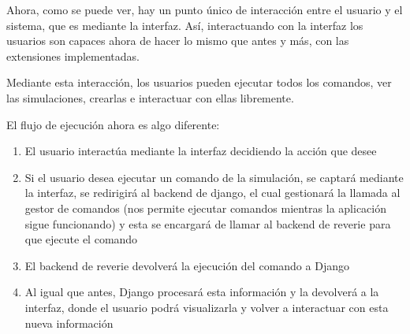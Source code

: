 Ahora, como se puede ver, hay un punto único de interacción entre el usuario y el sistema, que es mediante la interfaz. Así, interactuando con la interfaz los usuarios son capaces ahora de hacer lo mismo que antes y más, con las extensiones implementadas.

Mediante esta interacción, los usuarios pueden ejecutar todos los comandos, ver las simulaciones, crearlas e interactuar con ellas libremente.

El flujo de ejecución ahora es algo diferente:

\begin{enumerate}
	\item El usuario interactúa mediante la interfaz decidiendo la acción que desee
	
	\item Si el usuario desea ejecutar un comando de la simulación, se captará mediante la interfaz, se redirigirá al backend de django, el cual gestionará la llamada al gestor de comandos (nos permite ejecutar comandos mientras la aplicación sigue funcionando) y esta se encargará de llamar al backend de reverie para que ejecute el comando
	
	\item El backend de reverie devolverá la ejecución del comando a Django
	
	\item Al igual que antes, Django procesará esta información y la devolverá a la interfaz, donde el usuario podrá visualizarla y volver a interactuar con esta nueva información
	
\end{enumerate}
